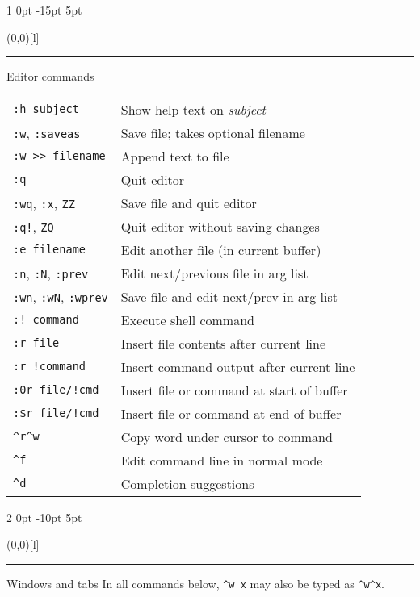 \documentclass[a4paper, landscape, 10pt]{article}
\makeatletter
\renewcommand{\section}{%
    \@startsection{section}%
        {1}%
        {0pt}%
        {-15pt}%
        {5pt}%
        {\protect\makebox(0,0)[l]{\color{accentcolor!80}\rule[8pt]{\columnwidth}{19pt}}\hspace{.5em}\fontsize{14pt}{12pt}\selectfont\bfseries\color{white}}}
\renewcommand{\subsection}{%
    \@startsection{subsection}%
        {2}%
        {0pt}%
        {-10pt}%
        {5pt}%
        {\protect\makebox(0,0)[l]{\color{accentcolor!20}\rule[7pt]{\columnwidth}{19pt}}\hspace{.5em}\fontsize{12pt}{12pt}\selectfont\bfseries\itshape\color{accentcolor}}}
\newcommand{\V}[1]{\texttt{\textup{#1}}}
\makeatother
\begin{document}
\begin{multicols*}{3}
\section{Editor commands}
    \begin{tabularx}{\columnwidth}{l>{\raggedright\arraybackslash}X}
\V{:h subject}
        &Show help text on \emph{subject}\\
\V{:w}, \V{:saveas}
        &Save file; takes optional filename\\
\V{:w >{}> filename}
        &Append text to file\\
\V{:q}
        &Quit editor\\
\V{:wq}, \V{:x}, \V{ZZ}
        &Save file and quit editor\\
\V{:q!}, \V{ZQ}
        &Quit editor without saving changes\\
\V{:e filename}
        &Edit another file (in current buffer)\\
\V{:n}, \V{:N}, \V{:prev}
        &Edit next/previous file in arg list\\
\V{:wn}, \V{:wN}, \V{:wprev}
        &Save file and edit next/prev in arg list\\
\V{:! command}
        &Execute shell command\\
\V{:r file}
        &Insert file contents after current line\\
\V{:r !command}
        &Insert command output after current line\\
\V{:0r file/!cmd}
        &Insert file or command at start of buffer\\
\verb|:$r file/!cmd|
        &Insert file or command at end of buffer\\

\verb|^r^w|
        &Copy word under cursor to command\\
\verb|^f|
        &Edit command line in normal mode\\
\verb|^d|
        &Completion suggestions
    \end{tabularx}

\subsection{Windows and tabs}
In all commands below, \verb|^w x| may also be typed as \verb|^w^x|.
\vspace{.25\baselineskip}


\end{multicols*}
\end{document}
